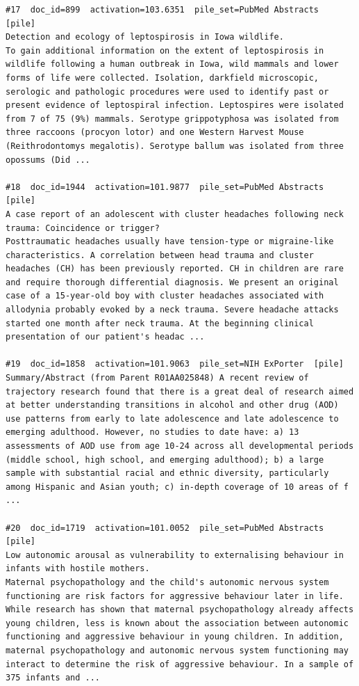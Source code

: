 \begin{verbatim}
#17  doc_id=899  activation=103.6351  pile_set=PubMed Abstracts  [pile]
Detection and ecology of leptospirosis in Iowa wildlife.
To gain additional information on the extent of leptospirosis in wildlife following a human outbreak in Iowa, wild mammals and lower forms of life were collected. Isolation, darkfield microscopic, serologic and pathologic procedures were used to identify past or present evidence of leptospiral infection. Leptospires were isolated from 7 of 75 (9%) mammals. Serotype grippotyphosa was isolated from three raccoons (procyon lotor) and one Western Harvest Mouse (Reithrodontomys megalotis). Serotype ballum was isolated from three opossums (Did ...

#18  doc_id=1944  activation=101.9877  pile_set=PubMed Abstracts  [pile]
A case report of an adolescent with cluster headaches following neck trauma: Coincidence or trigger?
Posttraumatic headaches usually have tension-type or migraine-like characteristics. A correlation between head trauma and cluster headaches (CH) has been previously reported. CH in children are rare and require thorough differential diagnosis. We present an original case of a 15-year-old boy with cluster headaches associated with allodynia probably evoked by a neck trauma. Severe headache attacks started one month after neck trauma. At the beginning clinical presentation of our patient's headac ...

#19  doc_id=1858  activation=101.9063  pile_set=NIH ExPorter  [pile]
Summary/Abstract (from Parent R01AA025848) A recent review of trajectory research found that there is a great deal of research aimed at better understanding transitions in alcohol and other drug (AOD) use patterns from early to late adolescence and late adolescence to emerging adulthood. However, no studies to date have: a) 13 assessments of AOD use from age 10-24 across all developmental periods (middle school, high school, and emerging adulthood); b) a large sample with substantial racial and ethnic diversity, particularly among Hispanic and Asian youth; c) in-depth coverage of 10 areas of f ...

#20  doc_id=1719  activation=101.0052  pile_set=PubMed Abstracts  [pile]
Low autonomic arousal as vulnerability to externalising behaviour in infants with hostile mothers.
Maternal psychopathology and the child's autonomic nervous system functioning are risk factors for aggressive behaviour later in life. While research has shown that maternal psychopathology already affects young children, less is known about the association between autonomic functioning and aggressive behaviour in young children. In addition, maternal psychopathology and autonomic nervous system functioning may interact to determine the risk of aggressive behaviour. In a sample of 375 infants and ...

\end{verbatim}

